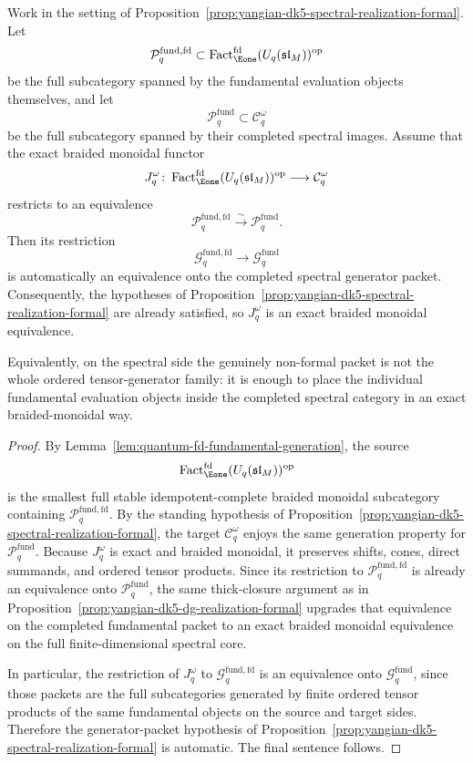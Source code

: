 \begin{proposition}
\label{prop:yangian-dk5-spectral-fundamental-packet}
Work in the setting of
Proposition~\ref{prop:yangian-dk5-spectral-realization-formal}.  Let
\[
\mathcal{P}^{\mathrm{fund,fd}}_{q}
\subset
\operatorname{Fact}_{\Eone}^{\mathrm{fd}}(U_q(\mathfrak{sl}_M))^{\mathrm{op}}
\]
be the full subcategory spanned by the fundamental evaluation objects
themselves, and let
\[
\mathcal{P}^{\mathrm{fund}}_{q}
\subset
\mathcal{C}_q^\omega
\]
be the full subcategory spanned by their completed spectral images.
Assume that the exact braided monoidal functor
\[
J_q^\omega\colon
\operatorname{Fact}_{\Eone}^{\mathrm{fd}}(U_q(\mathfrak{sl}_M))^{\mathrm{op}}
\longrightarrow
\mathcal{C}_q^\omega
\]
restricts to an equivalence
\[
\mathcal{P}^{\mathrm{fund,fd}}_{q}
\xrightarrow{\sim}
\mathcal{P}^{\mathrm{fund}}_{q}.
\]
Then its restriction
\[
\mathcal{G}^{\mathrm{fund,fd}}_{q}
\longrightarrow
\mathcal{G}^{\mathrm{fund}}_{q}
\]
is automatically an equivalence onto the completed spectral
generator packet.  Consequently, the hypotheses of
Proposition~\ref{prop:yangian-dk5-spectral-realization-formal} are
already satisfied, so \(J_q^\omega\) is an exact braided monoidal
equivalence.

Equivalently, on the spectral side the genuinely non-formal packet is
not the whole ordered tensor-generator family: it is enough to place
the individual fundamental evaluation objects inside the completed
spectral category in an exact braided-monoidal way.
\end{proposition}

\begin{proof}
By Lemma~\ref{lem:quantum-fd-fundamental-generation}, the source
\[
\operatorname{Fact}_{\Eone}^{\mathrm{fd}}(U_q(\mathfrak{sl}_M))^{\mathrm{op}}
\]
is the smallest full stable idempotent-complete braided monoidal
subcategory containing \(\mathcal{P}^{\mathrm{fund,fd}}_{q}\).  By the
standing hypothesis of
Proposition~\ref{prop:yangian-dk5-spectral-realization-formal}, the
target \(\mathcal{C}_q^\omega\) enjoys the same generation property for
\(\mathcal{P}^{\mathrm{fund}}_{q}\).  Because \(J_q^\omega\) is exact
and braided monoidal, it preserves shifts, cones, direct summands, and
ordered tensor products.  Since its restriction to
\(\mathcal{P}^{\mathrm{fund,fd}}_{q}\) is already an equivalence onto
\(\mathcal{P}^{\mathrm{fund}}_{q}\), the same thick-closure argument as
in Proposition~\ref{prop:yangian-dk5-dg-realization-formal} upgrades
that equivalence on the completed fundamental packet to an exact
braided monoidal equivalence on the full finite-dimensional spectral
core.

In particular, the restriction of \(J_q^\omega\) to
\(\mathcal{G}^{\mathrm{fund,fd}}_{q}\) is an equivalence onto
\(\mathcal{G}^{\mathrm{fund}}_{q}\), since those packets are the full
subcategories generated by finite ordered tensor products of the same
fundamental objects on the source and target sides.  Therefore the
generator-packet hypothesis of
Proposition~\ref{prop:yangian-dk5-spectral-realization-formal} is
automatic.  The final sentence follows.
\end{proof}

